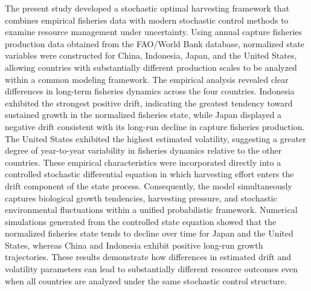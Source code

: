 \documentclass[11pt]{article}
\begin{document}
	
	
	The present study developed a stochastic optimal harvesting framework that combines empirical fisheries data with modern stochastic control methods to examine resource management under uncertainty. Using annual capture fisheries production data obtained from the FAO/World Bank database, normalized state variables were constructed for China, Indonesia, Japan, and the United States, allowing countries with substantially different production scales to be analyzed within a common modeling framework. The empirical analysis revealed clear differences in long-term fisheries dynamics across the four countries. Indonesia exhibited the strongest positive drift, indicating the greatest tendency toward sustained growth in the normalized fisheries state, while Japan displayed a negative drift consistent with its long-run decline in capture fisheries production. The United States exhibited the highest estimated volatility, suggesting a greater degree of year-to-year variability in fisheries dynamics relative to the other countries. These empirical characteristics were incorporated directly into a controlled stochastic differential equation in which harvesting effort enters the drift component of the state process. Consequently, the model simultaneously captures biological growth tendencies, harvesting pressure, and stochastic environmental fluctuations within a unified probabilistic framework. Numerical simulations generated from the controlled state equation showed that the normalized fisheries state tends to decline over time for Japan and the United States, whereas China and Indonesia exhibit positive long-run growth trajectories. These results demonstrate how differences in estimated drift and volatility parameters can lead to substantially different resource outcomes even when all countries are analyzed under the same stochastic control structure.
	
\end{document}
